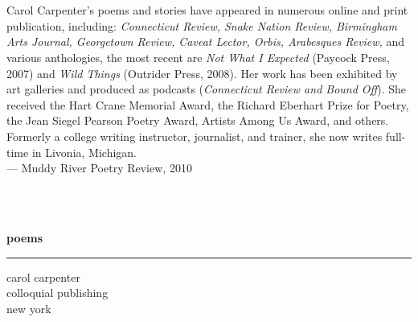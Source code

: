 \documentclass[10pt]{article}
\author{}
\date{}
\begin{document}
\pagestyle{empty}
\pagecolor{darkvintageorange}
\color{white}
\noindent
\begin{minipage}[t][9.861in][t]{6.625in}
  \noindent
  \centering
  \mbox{ } \hfill
  \begin{minipage}{3in}
    \vspace*{-4in}
    \\[4pt]
    Carol Carpenter's poems and stories have appeared in numerous online and
print publication, including: \emph{Connecticut Review, Snake Nation
Review, Birmingham Arts Journal, Georgetown Review, Caveat Lector,
Orbis, Arabesques Review,} and various anthologies, the most recent are
\emph{Not What I Expected} (Paycock Press, 2007) and \emph{Wild Things}
(Outrider Press, 2008). Her work has been exhibited by art galleries and
produced as podcasts (\emph{Connecticut Review and Bound Off}). She
received the Hart Crane Memorial Award, the Richard Eberhart Prize for
Poetry, the Jean Siegel Pearson Poetry Award, Artists Among Us Award,
and others. Formerly a college writing instructor, journalist, and
trainer, she now writes full-time in Livonia, Michigan.
\\[2pt]
\mbox{} \hfill {--- Muddy River Poetry Review}, 2010
\end{minipage}%
\hfill\mbox{ }
\end{minipage}%
\hspace*{-0.125in}
\begin{minipage}[t][9.861in][t]{0.944in}
\end{minipage}%
\begin{minipage}[t][9.861in][t]{6.625in}
  \noindent
  \vspace*{-6in} \mbox{ }
  \\
  \hspace*{1.625in} {\fontsize{86}{52}\sffamily\bfseries poems} \qquad
  \\[-10pt]
  \hrule height 1pt
  \vspace*{2pt}
  \hspace*{3in} {\fontsize{24}{52}\sffamily carol carpenter} \qquad
  \\[5.5in]
  \hspace*{3.625in} {\sffamily\large colloquial publishing} \qquad
  \\
  \hspace*{3.625in} {\sffamily new york} \qquad
\end{minipage}
\end{document}

